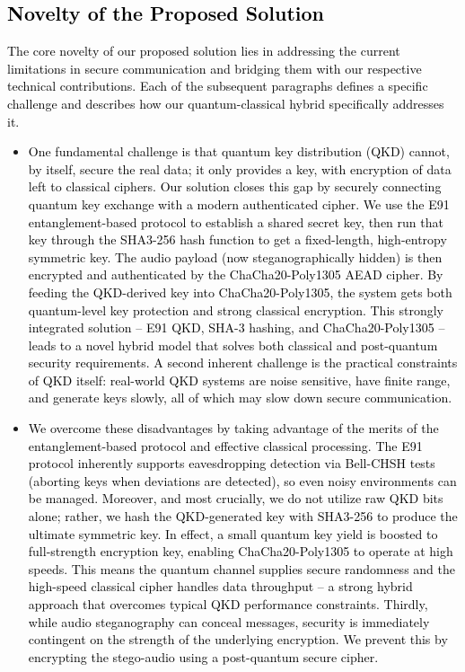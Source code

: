 \documentclass[a4paper]{cas-sc}
\begin{document}
\subsection{\textcolor{black}{Novelty of the Proposed Solution}}
\textcolor{black}{The core novelty of our proposed solution lies in addressing the current limitations in secure communication and bridging them with our respective technical contributions. Each of the subsequent paragraphs defines a specific challenge and describes how our quantum-classical hybrid specifically addresses it.}
\begin{itemize}

    \item \textcolor{black}{One fundamental challenge is that quantum key distribution (QKD) cannot, by itself, secure the real data; it only provides a key, with encryption of data left to classical ciphers. Our solution closes this gap by securely connecting quantum key exchange with a modern authenticated cipher. We use the E91 entanglement-based protocol to establish a shared secret key, then run that key through the SHA3-256 hash function to get a fixed-length, high-entropy symmetric key. The audio payload (now steganographically hidden) is then encrypted and authenticated by the ChaCha20-Poly1305 AEAD cipher. By feeding the QKD-derived key into ChaCha20-Poly1305, the system gets both quantum-level key protection and strong classical encryption. This strongly integrated solution – E91 QKD, SHA-3 hashing, and ChaCha20-Poly1305 – leads to a novel hybrid model that solves both classical and post-quantum security requirements. A second inherent challenge is the practical constraints of QKD itself: real-world QKD systems are noise sensitive, have finite range, and generate keys slowly, all of which may slow down secure communication.}

    \item \textcolor{black}{We overcome these disadvantages by taking advantage of the merits of the entanglement-based protocol and effective classical processing. The E91 protocol inherently supports eavesdropping detection via Bell-CHSH tests (aborting keys when deviations are detected), so even noisy environments can be managed. Moreover, and most crucially, we do not utilize raw QKD bits alone; rather, we hash the QKD-generated key with SHA3-256 to produce the ultimate symmetric key. In effect, a small quantum key yield is boosted to full-strength encryption key, enabling ChaCha20-Poly1305 to operate at high speeds. This means the quantum channel supplies secure randomness and the high-speed classical cipher handles data throughput -- a strong hybrid approach that overcomes typical QKD performance constraints. Thirdly, while audio steganography can conceal messages, security is immediately contingent on the strength of the underlying encryption. We prevent this by encrypting the stego-audio using a post-quantum secure cipher.}


\end{itemize}
\end{document}
